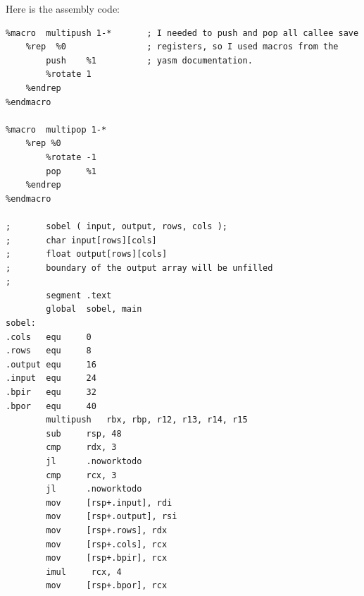\documentclass[11pt,b5paper]{book}
\begin{document}
Here is the assembly code:

\begin{verbatim}
%macro  multipush 1-*       ; I needed to push and pop all callee save
    %rep  %0                ; registers, so I used macros from the
        push    %1          ; yasm documentation.
        %rotate 1
    %endrep
%endmacro

%macro  multipop 1-*
    %rep %0
        %rotate -1
        pop     %1
    %endrep
%endmacro

;       sobel ( input, output, rows, cols );
;       char input[rows][cols]
;       float output[rows][cols]
;       boundary of the output array will be unfilled
;
        segment .text
        global  sobel, main
sobel:
.cols   equ     0
.rows   equ     8
.output equ     16
.input  equ     24
.bpir   equ     32
.bpor   equ     40
        multipush   rbx, rbp, r12, r13, r14, r15
        sub     rsp, 48
        cmp     rdx, 3
        jl      .noworktodo
        cmp     rcx, 3
        jl      .noworktodo
        mov     [rsp+.input], rdi
        mov     [rsp+.output], rsi
        mov     [rsp+.rows], rdx
        mov     [rsp+.cols], rcx
        mov     [rsp+.bpir], rcx
        imul     rcx, 4
        mov     [rsp+.bpor], rcx


\end{verbatim}
\end{document}
